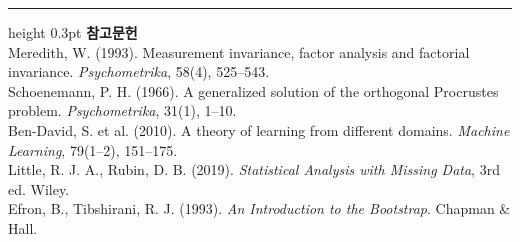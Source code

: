 \documentclass[10pt]{article}
\begin{document}
\vspace{0.6em}
\hrule height 0.3pt
\vspace{0.5em}
{\footnotesize
\textbf{참고문헌}\\[0.3em]
Meredith, W. (1993). Measurement invariance, factor analysis and factorial
invariance. \emph{Psychometrika}, 58(4), 525--543.\\[0.15em]
Schoenemann, P. H. (1966). A generalized solution of the orthogonal Procrustes
problem. \emph{Psychometrika}, 31(1), 1--10.\\[0.15em]
Ben-David, S. et al. (2010). A theory of learning from different domains.
\emph{Machine Learning}, 79(1--2), 151--175.\\[0.15em]
Little, R. J. A., Rubin, D. B. (2019). \emph{Statistical Analysis with Missing
Data}, 3rd ed. Wiley.\\[0.15em]
Efron, B., Tibshirani, R. J. (1993). \emph{An Introduction to the Bootstrap}.
Chapman \& Hall.
}
\end{document}
